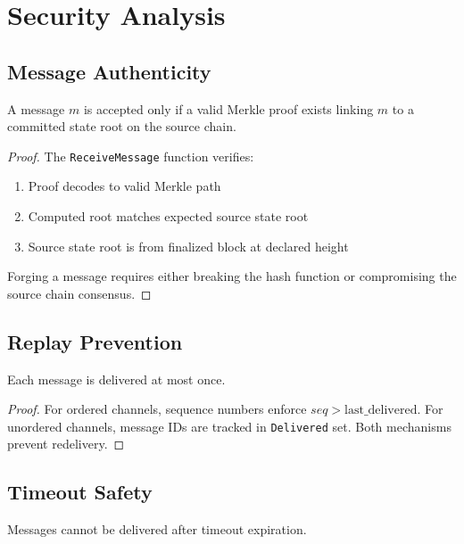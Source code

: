 \documentclass[11pt,twocolumn]{article}
\begin{document}
\section{Security Analysis}

\subsection{Message Authenticity}

\begin{theorem}
A message $m$ is accepted only if a valid Merkle proof exists linking $m$ to a committed state root on the source chain.
\end{theorem}

\begin{proof}
The \texttt{ReceiveMessage} function verifies:
\begin{enumerate}
\item Proof decodes to valid Merkle path
\item Computed root matches expected source state root
\item Source state root is from finalized block at declared height
\end{enumerate}
Forging a message requires either breaking the hash function or compromising the source chain consensus.
\end{proof}

\subsection{Replay Prevention}

\begin{theorem}[No Replay]
Each message is delivered at most once.
\end{theorem}

\begin{proof}
For ordered channels, sequence numbers enforce $seq > \text{last\_delivered}$.
For unordered channels, message IDs are tracked in \texttt{Delivered} set.
Both mechanisms prevent redelivery.
\end{proof}

\subsection{Timeout Safety}

\begin{theorem}
Messages cannot be delivered after timeout expiration.
\end{theorem}
\end{document}
